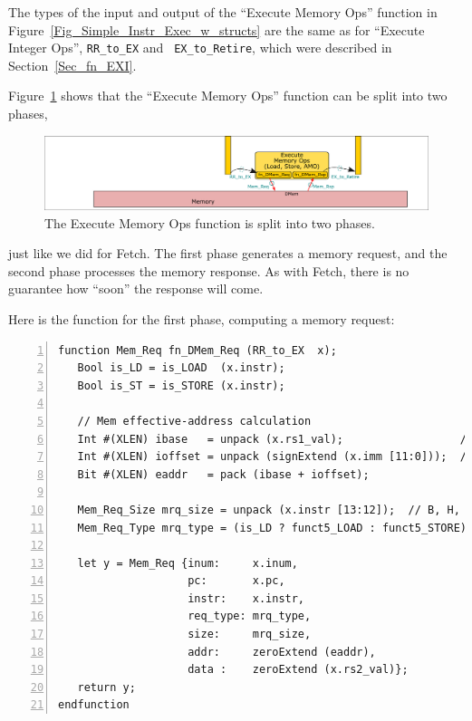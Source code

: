 \label{Sec_fn_DMem}


The types of the input and output of the ``Execute Memory Ops''
function in Figure~\ref{Fig_Simple_Instr_Exec_w_structs} are the same
as for ``Execute Integer Ops'', {\ie} {\tt RR\_to\_EX} and {\tt
EX\_to\_Retire}, which were described in Section~\ref{Sec_fn_EXI}.

Figure~\ref{Fig_fn_DMem} shows that the ``Execute Memory Ops''
function can be split into two phases,
\begin{figure}[htbp]
  \centerline{\includegraphics[width=6in,angle=0]{ch060/Figures/Fig_fn_DMem}}
  \caption{\label{Fig_fn_DMem}The Execute Memory Ops function is split into two phases.}
\end{figure}
just like we did for Fetch.  The first phase generates a memory
request, and the second phase processes the memory response.  As with
Fetch, there is no guarantee how ``soon'' the response will come.

Here is the function for the first phase, computing a memory request:
{\small
\begin{Verbatim}[frame=single, numbers=left]
function Mem_Req fn_DMem_Req (RR_to_EX  x);
   Bool is_LD = is_LOAD  (x.instr);
   Bool is_ST = is_STORE (x.instr);

   // Mem effective-address calculation
   Int #(XLEN) ibase   = unpack (x.rs1_val);                  // Signed
   Int #(XLEN) ioffset = unpack (signExtend (x.imm [11:0]));  // Signed
   Bit #(XLEN) eaddr   = pack (ibase + ioffset);

   Mem_Req_Size mrq_size = unpack (x.instr [13:12]);  // B, H, W or D
   Mem_Req_Type mrq_type = (is_LD ? funct5_LOAD : funct5_STORE);

   let y = Mem_Req {inum:     x.inum,
                    pc:       x.pc,
                    instr:    x.instr,
                    req_type: mrq_type,
                    size:     mrq_size,
                    addr:     zeroExtend (eaddr),
                    data :    zeroExtend (x.rs2_val)};
   return y;
endfunction
\end{Verbatim}
}

